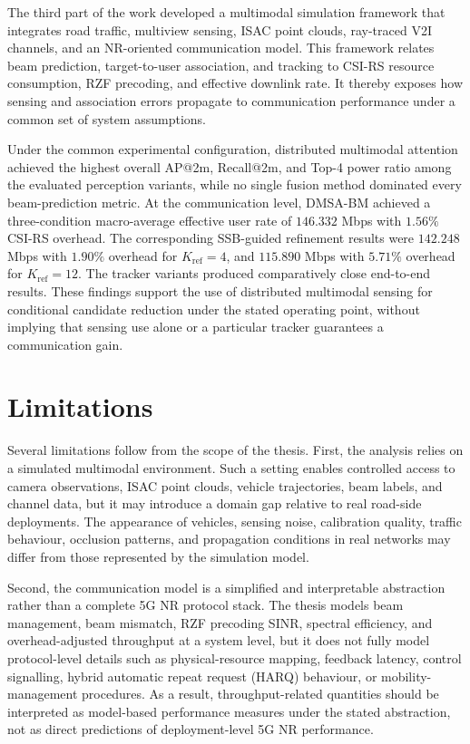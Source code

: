 The third part of the work developed a multimodal simulation framework that
integrates road traffic, multiview sensing, ISAC point clouds, ray-traced V2I
channels, and an NR-oriented communication model. This framework relates beam
prediction, target-to-user association, and tracking to CSI-RS resource
consumption, RZF precoding, and effective downlink rate. It thereby exposes how
sensing and association errors propagate to communication performance under a
common set of system assumptions.

Under the common experimental configuration, distributed multimodal attention
achieved the highest overall AP@2m, Recall@2m, and Top-4 power ratio among the
evaluated perception variants, while no single fusion method dominated every
beam-prediction metric. At the communication level, DMSA-BM achieved a
three-condition macro-average effective user rate of \(146.332\) Mbps with
\(1.56\%\) CSI-RS overhead. The corresponding SSB-guided refinement results
were \(142.248\) Mbps with \(1.90\%\) overhead for
\(K_{\mathrm{ref}}=4\), and \(115.890\) Mbps with \(5.71\%\) overhead for
\(K_{\mathrm{ref}}=12\). The tracker variants produced comparatively close
end-to-end results. These findings support the use of distributed multimodal
sensing for conditional candidate reduction under the stated operating point,
without implying that sensing use alone or a particular tracker guarantees a
communication gain.

\section{Limitations}
\label{sec:conclusion-limitations}

Several limitations follow from the scope of the thesis. First, the analysis
relies on a simulated multimodal environment. Such a setting enables controlled
access to camera observations, ISAC point clouds, vehicle trajectories, beam labels, and
channel data, but it may introduce a domain gap relative to real road-side
deployments. The appearance of vehicles, sensing noise, calibration quality,
traffic behaviour, occlusion patterns, and propagation conditions in real
networks may differ from those represented by the simulation model.

Second, the communication model is a simplified and interpretable
abstraction rather than a complete 5G NR protocol stack. The thesis models
beam management, beam mismatch, RZF precoding SINR, spectral efficiency, and
overhead-adjusted throughput at a system level, but it does not fully model
protocol-level details such as physical-resource mapping, feedback latency,
control signalling, hybrid automatic repeat request (HARQ) behaviour, or
mobility-management procedures. As a
result, throughput-related quantities should be interpreted as
model-based performance measures under the stated abstraction, not as direct
predictions of deployment-level 5G NR performance.

